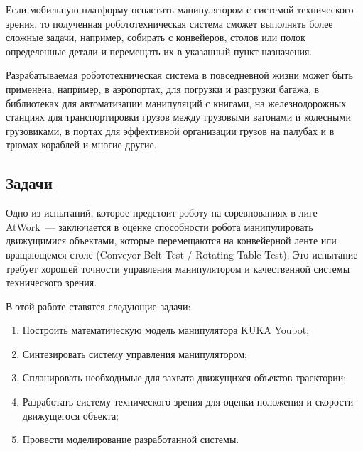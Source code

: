 Если мобильную платформу оснастить манипулятором с системой технического зрения, то полученная робототехническая система сможет выполнять более сложные задачи, например, собирать с конвейеров, столов или полок определенные детали и перемещать их в указанный пункт назначения.

Разрабатываемая робототехническая система в повседневной жизни может быть применена, например, в аэропортах, для погрузки и разгрузки багажа, в библиотеках для автоматизации манипуляций с книгами, на железнодорожных станциях для транспортировки грузов между грузовыми вагонами и колесными грузовиками, в портах для эффективной организации грузов на палубах и в трюмах кораблей и многие другие.

\subsection*{Задачи}

Одно из испытаний, которое предстоит роботу на соревнованиях в лиге AtWork~--- заключается в оценке способности робота манипулировать движущимися объектами, которые перемещаются на конвейерной ленте или вращающемся столе (Conveyor Belt Test / Rotating Table Test). Это испытание требует хорошей точности управления манипулятором и качественной системы технического зрения.

В этой работе ставятся следующие задачи:
\begin{enumerate}
	\item Построить математическую модель манипулятора KUKA Youbot;
	\item Синтезировать систему управления манипулятором;
	\item Спланировать необходимые для захвата движущихся объектов траектории;
	\item Разработать систему технического зрения для оценки положения и скорости движущегося объекта;
	\item Провести моделирование разработанной системы.
\end{enumerate}

\newpage